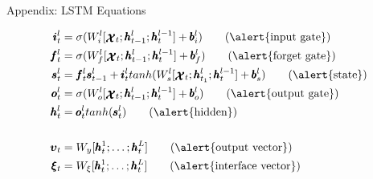 \documentclass{beamer}
\newcommand{\xx}{\pmb{\raisebox{-1.5pt}{$\mathcal{X}$}}}
\newcommand{\hh}{\pmb{h}}
\newcommand{\ii}{\pmb{i}}
\newcommand{\oo}{\pmb{o}}
\newcommand{\ff}{\pmb{f}}
\newcommand{\Ss}{\pmb{s}}
\newcommand{\Cc}{\pmb{c}}
\newcommand{\bb}{\pmb{b}}
\begin{document}
\begin{frame}{Appendix: LSTM Equations}

	\begin{align}
	\ii_t^l &= \sigma(W_i^l[\xx_t;\hh_{t-1}^l;\hh_t^{l-1}]+\bb_i^l)   \tag{\alert{input gate}}\\
	\ff_t^l &= \sigma(W_f^l[\xx_t;\hh_{t-1}^l;\hh_t^{l-1}]+\bb_f^l)	\tag{\alert{forget gate}}\\
	\Ss_t^l &= \ff_t^l\Ss_{t-1}^l + \ii_t^ltanh(W_s^l[\xx_t;\hh_{t_1}^l;\hh_t^{l-1}] + \bb_s^l)		\tag{\alert{state}}\\
	\oo_t^l &= \sigma(W_o^l[\xx_t;\hh_{t-1}^l;\hh_t^{l-1}]+\bb_o^l)		\tag{\alert{output gate}}\\
	\hh_t^l &= \oo_t^ltanh(\Ss_t^l)		\tag{\alert{hidden}}\\
	\nonumber \\ 
	\pmb{\upsilon}_t &= W_y[\hh_t^1;\dots;\hh_t^L]		\tag{\alert{output vector}}\\
	\pmb{\xi}_t &= W_{\xi}[\hh_t^1;\dots;\hh_t^L]		\tag{\alert{interface vector}}
	\end{align}
\end{frame}
\end{document}
